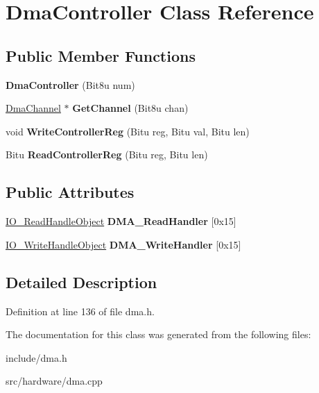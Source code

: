\hypertarget{classDmaController}{\section{Dma\-Controller Class Reference}
\label{classDmaController}
}
\subsection*{Public Member Functions}
\begin{DoxyCompactItemize}
\item 
\hypertarget{classDmaController_a30d3a9f46dd43dd2135e48f03a47d2fd}{{\bfseries Dma\-Controller} (Bit8u num)}\label{classDmaController_a30d3a9f46dd43dd2135e48f03a47d2fd}

\item 
\hypertarget{classDmaController_a43703c996fcc2913b8a3e41fc472abcf}{\hyperlink{classDmaChannel}{Dma\-Channel} $\ast$ {\bfseries Get\-Channel} (Bit8u chan)}\label{classDmaController_a43703c996fcc2913b8a3e41fc472abcf}

\item 
\hypertarget{classDmaController_a9b1c5a36779958c5f41538fc14c7ab5c}{void {\bfseries Write\-Controller\-Reg} (Bitu reg, Bitu val, Bitu len)}\label{classDmaController_a9b1c5a36779958c5f41538fc14c7ab5c}

\item 
\hypertarget{classDmaController_a1941d446f787328736f8fe4652f5b1aa}{Bitu {\bfseries Read\-Controller\-Reg} (Bitu reg, Bitu len)}\label{classDmaController_a1941d446f787328736f8fe4652f5b1aa}

\end{DoxyCompactItemize}
\subsection*{Public Attributes}
\begin{DoxyCompactItemize}
\item 
\hypertarget{classDmaController_a889641452643bba75fd37f0fb557e913}{\hyperlink{classIO__ReadHandleObject}{I\-O\-\_\-\-Read\-Handle\-Object} {\bfseries D\-M\-A\-\_\-\-Read\-Handler} \mbox{[}0x15\mbox{]}}\label{classDmaController_a889641452643bba75fd37f0fb557e913}

\item 
\hypertarget{classDmaController_aa1b220a17570b76681fdff3cc1453bd9}{\hyperlink{classIO__WriteHandleObject}{I\-O\-\_\-\-Write\-Handle\-Object} {\bfseries D\-M\-A\-\_\-\-Write\-Handler} \mbox{[}0x15\mbox{]}}\label{classDmaController_aa1b220a17570b76681fdff3cc1453bd9}

\end{DoxyCompactItemize}


\subsection{Detailed Description}


Definition at line 136 of file dma.\-h.



The documentation for this class was generated from the following files\-:\begin{DoxyCompactItemize}
\item 
include/dma.\-h\item 
src/hardware/dma.\-cpp\end{DoxyCompactItemize}
